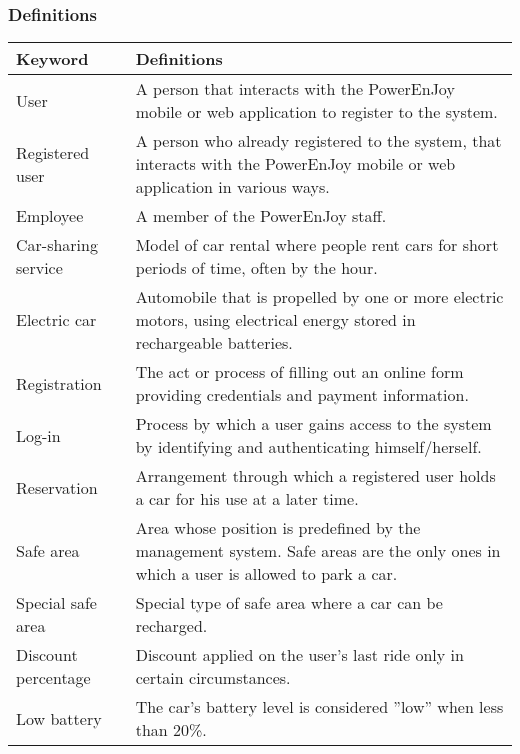 \subsubsection{Definitions}
\begin{center}
	\begin{tabular} { | m{4cm} | m{9cm} | }
		\hline
		\textbf{Keyword} & \textbf{Definitions}\\
		\hline
		User & A person that interacts with the PowerEnJoy mobile or web
		application to register to the system.\\
		\hline
		Registered user & A person who already registered to the system, that interacts with the PowerEnJoy mobile or web application in various ways.\\
		\hline
		Employee & A member of the PowerEnJoy staff.\\
		\hline
		Car-sharing service & Model of car rental where people rent cars for short periods of time, often by the hour.\\
		\hline
		Electric car & Automobile that is propelled by one or more electric motors, using electrical energy stored in rechargeable batteries.\\
		\hline
		Registration & The act or process of filling out an online form providing credentials and payment information.\\
		\hline
		Log-in & Process by which a user gains access to the system by identifying and authenticating himself/herself. \\
		\hline
		Reservation & Arrangement through which a registered user holds a car for his use at a later time.\\
		\hline
		Safe area & Area whose position is predefined by the management system. Safe areas are the only ones in which a user is allowed to park a car.\\
		\hline
		Special safe area & Special type of safe area where a car can be recharged.\\
		\hline
		Discount percentage & Discount applied on the user’s last ride only in certain circumstances.\\
		\hline
		Low battery & The car’s battery level is considered ”low” when less than 20\%.\\
		\hline
	\end{tabular}
\end{center}
\newpage
